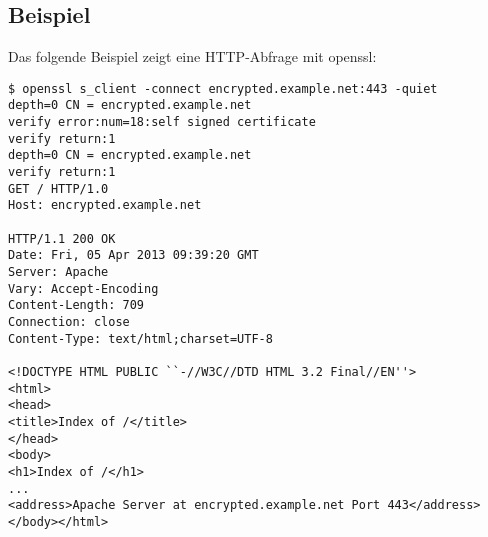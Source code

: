 \begin{normaltext}
  \subsection*{Beispiel}
  Das folgende Beispiel zeigt eine HTTP-Abfrage mit openssl:
  \begin{verbatim}
$ openssl s_client -connect encrypted.example.net:443 -quiet
depth=0 CN = encrypted.example.net
verify error:num=18:self signed certificate
verify return:1
depth=0 CN = encrypted.example.net
verify return:1
GET / HTTP/1.0
Host: encrypted.example.net

HTTP/1.1 200 OK
Date: Fri, 05 Apr 2013 09:39:20 GMT
Server: Apache
Vary: Accept-Encoding
Content-Length: 709
Connection: close
Content-Type: text/html;charset=UTF-8

<!DOCTYPE HTML PUBLIC ``-//W3C//DTD HTML 3.2 Final//EN''>
<html>
<head>
<title>Index of /</title>
</head>
<body>
<h1>Index of /</h1>
...
<address>Apache Server at encrypted.example.net Port 443</address>
</body></html>
  \end{verbatim}
\end{normaltext}


